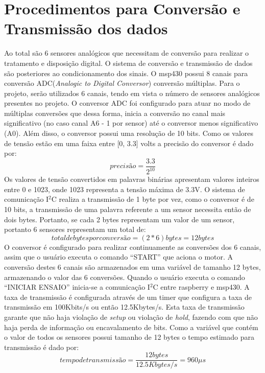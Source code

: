\section{Procedimentos para Conversão e Transmissão dos dados}
Ao total são 6 sensores analógicos que necessitam de conversão para realizar o tratamento e disposição digital. O sistema de conversão e transmissão de dados são posteriores ao condicionamento dos sinais.
O msp430 possui 8 canais para conversão ADC(\textit{Analogic to Digital Conversor}) conversão múltiplas. Para o projeto, serão utilizados 6 canais, tendo em vista o número de sensores analógicos presentes no projeto. O conversor ADC foi configurado para atuar no modo de múltiplas conversões que dessa forma, inicia a conversão no canal mais significativo (no caso canal A6 - 1 por sensor) até o conversor menos significativo (A0). Além disso, o conversor possui uma resolução de 10 bits. Como os valores de tensão estão em uma faixa entre [0, 3.3] volts a precisão do conversor é dado por:
\begin{equation}
precisão = \frac{3.3}{2^{10}}
\end{equation}
Os valores de tensão convertidos em palavras binárias apresentam valores inteiros entre 0 e 1023, onde 1023 representa a tensão máxima de 3.3V.
O sistema de comunicação I$^{2}$C realiza a transmissão de 1 byte por vez, como o conversor é de 10 bits, a transmissão de uma palavra referente a um sensor necessita então de dois bytes. Portanto, se cada 2 bytes representam um valor de um sensor, portanto 6 sensores representam um total de:
\begin{equation}
total de bytes por conversão = (2*6)bytes = 12bytes
\end{equation}
O conversor é configurado para realizar continuamente as conversões dos 6 canais, assim que o usuário executa o comando “START” que aciona o motor. A conversão destes 6 canais são armazenados em uma variável de tamanho 12 bytes, armazenando o valor das 6 conversões.
Quando o usuário executa o comando “INICIAR ENSAIO” inicia-se a comunicação I$^{2}$C entre raspberry e msp430. A taxa de transmissão é configurada através de um timer que configura a taxa de transmissão em 100Kbits/s ou então 12.5Kbytes/s. Esta taxa de transmissão garante que não haja violação de \textit{setup} ou violação de \textit{hold}, fazendo com que não haja perda de informação ou encavalamento de bits.
Como a variável que contém o valor de todos os sensores possui tamanho de 12 bytes o tempo estimado para transmissão é dado por:
\begin{equation}
tempo de transmissão = \frac{12bytes}{12.5Kbytes/s} = 960 \mu s
\end{equation}
